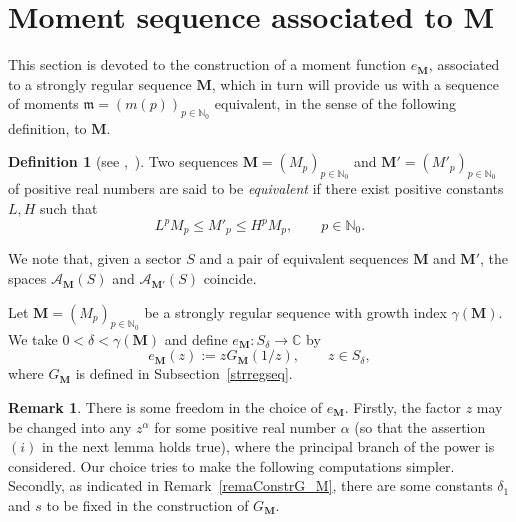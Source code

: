 \documentclass[11pt,a4paper,leqno]{article}
\theoremstyle{plain}
\theoremstyle{definition}
\newtheorem{defin}[theo]{Definition}
\newtheorem{rem}[theo]{Remark}
\def\C{\mathbb{C}}
\def\N{\mathbb{N}}
\def\a{\alpha}
\def\bM{\boldsymbol{M}}
\begin{document}
\section{Moment sequence associated to $\bM$}\label{seccion2}

This section is devoted to the construction of a moment function $e_{\bM}$, associated to a strongly regular sequence $\bM$, which in turn will provide us with a sequence of moments $\mathfrak{m}=(m(p))_{p\in\N_{0}}$ equivalent, in the sense of the following definition, to $\bM$.
\begin{defin}[see \cite{pet},~\cite{chaucho}]
Two sequences $\bM=(M_{p})_{p\in\N_0}$ and $\bM'=(M'_{p})_{p\in\N_0}$ of positive real numbers are said to be \textit{equivalent} if there exist positive constants $L,H$ such that
$$L^pM_p\le M'_p\le H^pM_p,\qquad p\in\N_0.$$
\end{defin}

We note that, given a sector $S$ and a pair of equivalent sequences $\bM$ and $\bM'$, the spaces $\mathcal{A}_{\bM}(S)$ and $\mathcal{A}_{\bM'}(S)$ coincide.

Let $\bM=(M_{p})_{p\in\N_0}$ be a strongly regular sequence with growth index $\gamma(\bM)$. We take $0<\delta<\gamma(\bM)$ and define $e_{\bM}:S_{\delta}\to\C$ by
\begin{equation}\label{funcione}
e_{\bM}(z):=zG_{\bM}(1/z), \qquad z\in S_{\delta},
\end{equation}
where $G_{\bM}$ is defined in Subsection~\ref{strregseq}.

\begin{rem}
There is some freedom in the choice of $e_{\bM}$. Firstly, the factor $z$ may be changed into any $z^{\alpha}$ for some positive real number $\a$ (so that the assertion $(i)$ in the next lemma holds true), where the principal branch of the power is considered. Our choice tries to make the following computations simpler. Secondly, as indicated in Remark~\ref{remaConstrG_M}, there are some constants $\delta_1$ and $s$ to be fixed in the construction of $G_{\bM}$.
\end{rem}
\end{document}
